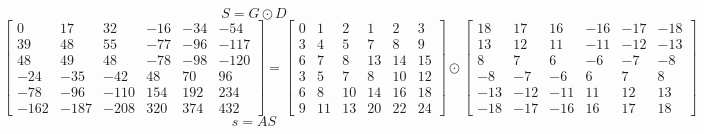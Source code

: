 \documentclass{article}%
\begin{document}
\[%
S = G \odot D%
\]%
\[%
\left[\begin{matrix}0 & 17 & 32 & -16 & -34 & -54\\39 & 48 & 55 & -77 & -96 & -117\\48 & 49 & 48 & -78 & -98 & -120\\-24 & -35 & -42 & 48 & 70 & 96\\-78 & -96 & -110 & 154 & 192 & 234\\-162 & -187 & -208 & 320 & 374 & 432\end{matrix}\right] = \left[\begin{matrix}0 & 1 & 2 & 1 & 2 & 3\\3 & 4 & 5 & 7 & 8 & 9\\6 & 7 & 8 & 13 & 14 & 15\\3 & 5 & 7 & 8 & 10 & 12\\6 & 8 & 10 & 14 & 16 & 18\\9 & 11 & 13 & 20 & 22 & 24\end{matrix}\right] \odot \left[\begin{matrix}18 & 17 & 16 & -16 & -17 & -18\\13 & 12 & 11 & -11 & -12 & -13\\8 & 7 & 6 & -6 & -7 & -8\\-8 & -7 & -6 & 6 & 7 & 8\\-13 & -12 & -11 & 11 & 12 & 13\\-18 & -17 & -16 & 16 & 17 & 18\end{matrix}\right]%
\]%
\[%
s = AS%
\]%
\end{document}
